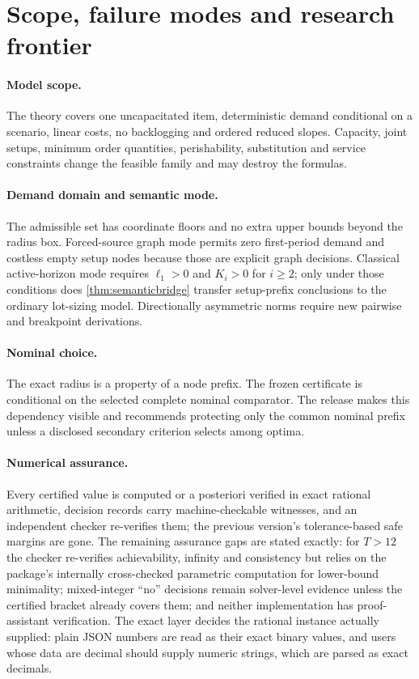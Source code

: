 \documentclass[11pt]{article}
\theoremstyle{definition}
\begin{document}
\section{Scope, failure modes and research frontier}\label{sec:scope}

\paragraph{Model scope.}
The theory covers one uncapacitated item, deterministic demand conditional on a scenario, linear costs, no backlogging and ordered reduced slopes. Capacity, joint setups, minimum order quantities, perishability, substitution and service constraints change the feasible family and may destroy the formulas.

\paragraph{Demand domain and semantic mode.}
The admissible set has coordinate floors and no extra upper bounds beyond the radius box. Forced-source graph mode permits zero first-period demand and costless empty setup nodes because those are explicit graph decisions. Classical active-horizon mode requires $\ell_1>0$ and $K_i>0$ for $i\ge2$; only under those conditions does \cref{thm:semanticbridge} transfer setup-prefix conclusions to the ordinary lot-sizing model. Directionally asymmetric norms require new pairwise and breakpoint derivations.

\paragraph{Nominal choice.}
The exact radius is a property of a node prefix. The frozen certificate is conditional on the selected complete nominal comparator. The release makes this dependency visible and recommends protecting only the common nominal prefix unless a disclosed secondary criterion selects among optima.

\paragraph{Numerical assurance.}
Every certified value is computed or a posteriori verified in exact rational arithmetic, decision records carry machine-checkable witnesses, and an independent checker re-verifies them; the previous version's tolerance-based safe margins are gone. The remaining assurance gaps are stated exactly: for $T>12$ the checker re-verifies achievability, infinity and consistency but relies on the package's internally cross-checked parametric computation for lower-bound minimality; mixed-integer ``no'' decisions remain solver-level evidence unless the certified bracket already covers them; and neither implementation has proof-assistant verification. The exact layer decides the rational instance actually supplied: plain JSON numbers are read as their exact binary values, and users whose data are decimal should supply numeric strings, which are parsed as exact decimals.
\end{document}
